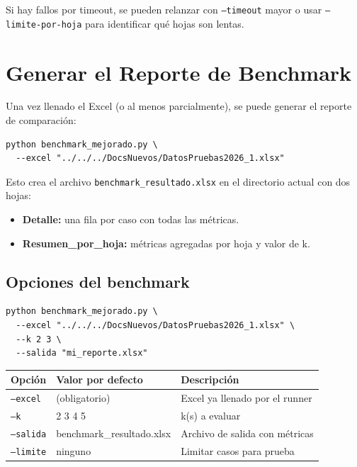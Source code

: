\documentclass[12pt,a4paper]{article}
\begin{document}
\begin{tipbox}
Si hay fallos por timeout, se pueden relanzar con \texttt{--timeout} mayor o usar \texttt{--limite-por-hoja} para identificar qué hojas son lentas.
\end{tipbox}

\section{Generar el Reporte de Benchmark}

Una vez llenado el Excel (o al menos parcialmente), se puede generar el reporte de comparación:

\begin{lstlisting}
python benchmark_mejorado.py \
  --excel "../../../DocsNuevos/DatosPruebas2026_1.xlsx"
\end{lstlisting}

Esto crea el archivo \texttt{benchmark\_resultado.xlsx} en el directorio actual con dos hojas:
\begin{itemize}
    \item \textbf{Detalle:} una fila por caso con todas las métricas.
    \item \textbf{Resumen\_por\_hoja:} métricas agregadas por hoja y valor de k.
\end{itemize}

\subsection{Opciones del benchmark}

\begin{lstlisting}
python benchmark_mejorado.py \
  --excel "../../../DocsNuevos/DatosPruebas2026_1.xlsx" \
  --k 2 3 \
  --salida "mi_reporte.xlsx"
\end{lstlisting}

\begin{longtable}{lll}
    \toprule
    Opción & Valor por defecto & Descripción \\
    \midrule
    \endhead
    \texttt{--excel}  & (obligatorio)              & Excel ya llenado por el runner \\
    \texttt{--k}      & 2 3 4 5                    & k(s) a evaluar \\
    \texttt{--salida} & benchmark\_resultado.xlsx  & Archivo de salida con métricas \\
    \texttt{--limite} & ninguno                    & Limitar casos para prueba \\
    \bottomrule
\end{longtable}
\end{document}
